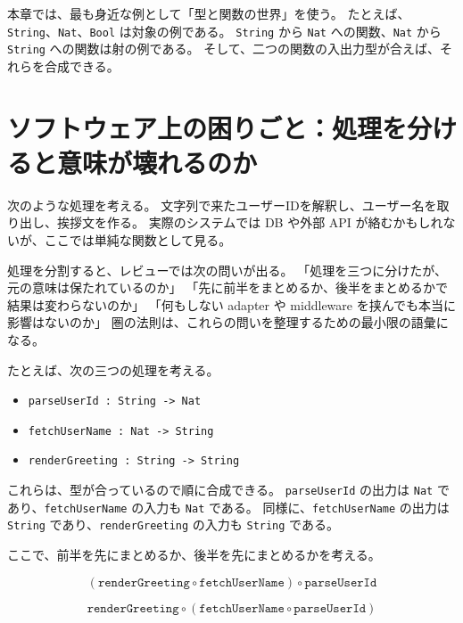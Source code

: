 
本章では、最も身近な例として「型と関数の世界」を使う。
たとえば、\texttt{String}、\texttt{Nat}、\texttt{Bool} は対象の例である。
\texttt{String} から \texttt{Nat} への関数、\texttt{Nat} から \texttt{String} への関数は射の例である。
そして、二つの関数の入出力型が合えば、それらを合成できる。

\section{ソフトウェア上の困りごと：処理を分けると意味が壊れるのか}

次のような処理を考える。
文字列で来たユーザーIDを解釈し、ユーザー名を取り出し、挨拶文を作る。
実際のシステムでは DB や外部 API が絡むかもしれないが、ここでは単純な関数として見る。

\begin{softwarebox}
処理を分割すると、レビューでは次の問いが出る。
「処理を三つに分けたが、元の意味は保たれているのか」
「先に前半をまとめるか、後半をまとめるかで結果は変わらないのか」
「何もしない adapter や middleware を挟んでも本当に影響はないのか」
圏の法則は、これらの問いを整理するための最小限の語彙になる。
\end{softwarebox}

たとえば、次の三つの処理を考える。

\begin{itemize}
\item \texttt{parseUserId : String -> Nat}
\item \texttt{fetchUserName : Nat -> String}
\item \texttt{renderGreeting : String -> String}
\end{itemize}

これらは、型が合っているので順に合成できる。
\texttt{parseUserId} の出力は \texttt{Nat} であり、\texttt{fetchUserName} の入力も \texttt{Nat} である。
同様に、\texttt{fetchUserName} の出力は \texttt{String} であり、\texttt{renderGreeting} の入力も \texttt{String} である。

ここで、前半を先にまとめるか、後半を先にまとめるかを考える。

\[
  (\texttt{renderGreeting} \circ \texttt{fetchUserName}) \circ \texttt{parseUserId}
\]

\[
  \texttt{renderGreeting} \circ (\texttt{fetchUserName} \circ \texttt{parseUserId})
\]

